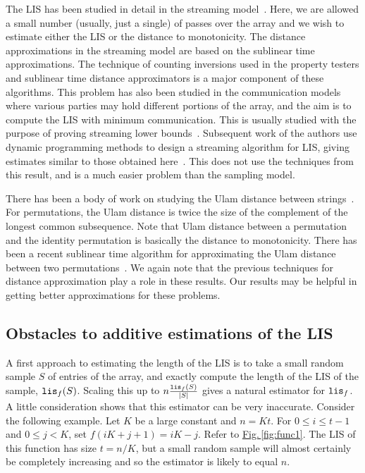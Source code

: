 \documentclass{acmsmall}
\newcommand{\Fig}[1]{\hyperref[fig:#1]{Fig.\,\ref*{fig:#1}}} %
\newcommand{\lis}{{\tt lis}}
\begin{document}
The LIS has been studied in detail in the streaming model~\cite{GJKK07,SW07,GG07,EJ08}. Here,
we are allowed a small number (usually, just a single) of passes over
the array and we wish to estimate either the LIS or the
distance to monotonicity. The distance approximations
in the streaming model
are based on the sublinear time approximations.
The technique of counting inversions used in the property
testers and sublinear time distance approximators is a major
component of these algorithms. This problem has
also been studied in the communication
models where various parties may hold different
portions of the array, and the aim is to compute
the LIS with minimum communication. This is usually
studied with the purpose of proving streaming lower bounds~\cite{GJKK07,GG07,EJ08}.
Subsequent work of the authors use dynamic programming methods to design
a streaming algorithm for LIS, giving estimates similar to those obtained here~\cite{SaSe12}.
This does not use the techniques from this result, and is a much easier problem
than the sampling model.

There has been a body of work on studying the Ulam
distance between strings~\cite{AK07,AK08,AIK09,AN10}. For permutations, the Ulam
distance is twice the size of the complement
of the longest common subsequence. Note that Ulam
distance between a permutation and the identity permutation
is basically the distance to monotonicity. There has
been a recent sublinear time algorithm for approximating
the Ulam distance between two permutations~\cite{AN10}. We again note
that the previous techniques for distance approximation
play a role in these results. Our results
may be helpful in getting better approximations
for these problems.

\subsection{Obstacles to additive estimations of the LIS} 

A first approach to estimating the length of the LIS is to take a small random sample $S$ of entries of the array, and
exactly compute the length of the LIS of the sample, $\lis_f(S)$.  Scaling this up to
$n\frac{\lis_f(S)}{|S|}$ gives a natural estimator for $\lis_f$.
A little consideration shows that this estimator can be very inaccurate.
Consider the following example.  Let $K$ be a large constant
and $n=Kt$. For $0 \leq i \leq t-1$ and $0 \leq j < K$,
set $f(iK+j+1)=iK-j$. Refer to \Fig{func1}.  The LIS of this function has size $t=n/K$, 
but a small random sample will almost certainly be completely
increasing and so the estimator is likely to equal $n$.

\end{document}
